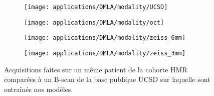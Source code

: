 \begin{figure}[!ht]
	\centering
	\begin{subfigure}{0.48\textwidth}
		\texttt{[image: applications/DMLA/modality/UCSD]}
	\end{subfigure}
\hfill
	\begin{subfigure}{0.48\textwidth}
		\texttt{[image: applications/DMLA/modality/oct]}
		\label{subfig:spectralis}
	\end{subfigure}
\hfill
	\begin{subfigure}{0.48\textwidth}
		\texttt{[image: applications/DMLA/modality/zeiss\_6mm]}
	\end{subfigure}
\hfill
	\begin{subfigure}{0.48\textwidth}
		\texttt{[image: applications/DMLA/modality/zeiss\_3mm]}
	\end{subfigure}
\caption{Acquisitions faites sur un même patient de la cohorte HMR comparées à un B-scan de la base publique UCSD sur laquelle sont entraînés nos modèles.}
\label{fig:IllustrationHMR_DMLA_modalities}
\end{figure}

